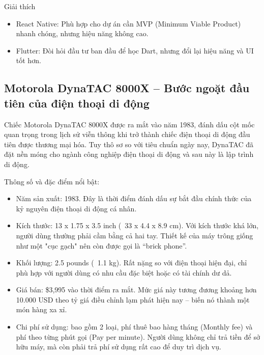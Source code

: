 \begin{flushleft}
        \begin{flushleft}
          \hspace*{0.8cm}Giải thích
          \setlength{\leftmargini}{1.5cm}
          \begin{itemize}
              \item React Native: Phù hợp cho dự án cần MVP (Minimum Viable Product) nhanh chóng, nhưng hiệu năng không cao.
              \item Flutter: Đòi hỏi đầu tư ban đầu để học Dart, nhưng đổi lại hiệu năng và UI tốt hơn.
          \end{itemize}
        \end{flushleft}
    \end{flushleft}

\subsection{Motorola DynaTAC 8000X – Bước ngoặt đầu tiên của điện thoại di động}
\renewcommand{\labelitemi}{--}    
\begin{flushleft}
    \hspace*{0.8cm}Chiếc Motorola DynaTAC 8000X được ra mắt vào năm 1983, đánh dấu cột mốc quan trọng trong lịch sử viễn thông khi trở thành chiếc điện thoại di động đầu tiên được thương mại hóa. Tuy thô sơ so với tiêu chuẩn ngày nay, DynaTAC đã đặt nền móng cho ngành công nghiệp điện thoại di động và sau này là lập trình di động.
\end{flushleft}

\begin{flushleft}
  \hspace*{0.8cm}Thông số và đặc điểm nổi bật:
  \setlength{\leftmargini}{1.5cm}
  \begin{itemize}
      \item Năm sản xuất: 1983. Đây là thời điểm đánh dấu sự bắt đầu chính thức của kỷ nguyên điện thoại di động cá nhân.
      \item Kích thước: 13 x 1.75 x 3.5 inch (~33 x 4.4 x 8.9 cm). Với kích thước khá lớn, người dùng thường phải cầm bằng cả hai tay. Thiết kế của máy trông giống như một "cục gạch" nên còn được gọi là “brick phone”.
      \item Khối lượng: 2.5 pounds (~1.1 kg). Rất nặng so với điện thoại hiện đại, chỉ phù hợp với người dùng có nhu cầu đặc biệt hoặc có tài chính dư dả.
      \item Giá bán: \$3,995 vào thời điểm ra mắt. Mức giá này tương đương khoảng hơn 10.000 USD theo tỷ giá điều chỉnh lạm phát hiện nay – biến nó thành một món hàng xa xỉ.
      \item Chi phí sử dụng: bao gồm 2 loại, phí thuê bao hàng tháng (Monthly fee) và  phí theo từng phút gọi (Pay per minute). Người dùng không chỉ trả tiền để sở hữu máy, mà còn phải trả phí sử dụng rất cao để duy trì dịch vụ.
  \end{itemize}
\end{flushleft}

